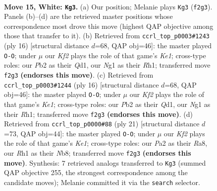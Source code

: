 \documentclass[11pt]{article}
\begin{document}
\begin{figure}[p]
\label{fig:thought-m26}
\end{figure}

\clearpage

\begin{figure}[p]\centering
\begin{subfigure}{0.46\textwidth}\centering
\resizebox{\linewidth}{!}{%
\newchessgame
\chessboard[
  setfen={2b1qrk1/r1pnnppp/1p2p3/p2pP3/3P1P2/2N5/PPP2KPP/R2Q1BNR w - - 0 15},
  showmover=false,
  pgfstyle=straightmove, color=movearrow, markmove={f2-g3}
]}
\caption{}
\end{subfigure}\hfill
\begin{subfigure}{0.46\textwidth}\centering
\resizebox{\linewidth}{!}{%
\newchessgame
\chessboard[
  setfen={rnbq1rk1/pp3pbp/2pp1np1/8/2PNP3/2N3P1/PP3PBP/R1BQK2R w KQ - 1 9},
  showmover=false,
  pgfstyle=straightmove, color=movearrow, markmove={e1-g1}
]}
\caption{}
\end{subfigure}
\\[4pt]
\begin{subfigure}{0.46\textwidth}\centering
\resizebox{\linewidth}{!}{%
\newchessgame
\chessboard[
  setfen={rnbq1rk1/pp3pbp/2pp1np1/8/2PNP3/2N3P1/PP3PBP/R1BQK2R w KQ - 1 9},
  showmover=false,
  pgfstyle=straightmove, color=movearrow, markmove={e1-g1}
]}
\caption{}
\end{subfigure}\hfill
\begin{subfigure}{0.46\textwidth}\centering
\resizebox{\linewidth}{!}{%
\newchessgame
\chessboard[
  setfen={rn2k2r/1p1qbpp1/p6p/2ppP3/P3nN2/5N2/1PPP2PP/R1BQ1RK1 b kq - 1 11},
  showmover=false,
  pgfstyle=straightmove, color=movearrow, markmove={e8-g8}
]}
\caption{}
\end{subfigure}
\caption{\textbf{Move 15, White: \texttt{Kg3}.} (a) Our position; Melanie plays \texttt{Kg3} (\texttt{f2g3}). Panels (b)--(d) are the retrieved master positions whose correspondence most drove this move (highest QAP objective among those that transfer to it). (b) Retrieved from \texttt{ccrl\_top\_p0003\#1243} (ply 16) [structural distance $d$=68, QAP obj=46]: the master played \texttt{O-O}; under $\mu$ our \emph{Kf2} plays the role of that game's \emph{Ke1}; cross-type roles: our \emph{P}b2 as their \emph{Q}d1, our \emph{N}g1 as their \emph{R}h1; transferred move \texttt{f2g3} \textbf{(endorses this move)}. (c) Retrieved from \texttt{ccrl\_top\_p0003\#1244} (ply 16) [structural distance $d$=68, QAP obj=46]: the master played \texttt{O-O}; under $\mu$ our \emph{Kf2} plays the role of that game's \emph{Ke1}; cross-type roles: our \emph{P}b2 as their \emph{Q}d1, our \emph{N}g1 as their \emph{R}h1; transferred move \texttt{f2g3} \textbf{(endorses this move)}. (d) Retrieved from \texttt{ccrl\_top\_p0000\#88} (ply 21) [structural distance $d$=73, QAP obj=44]: the master played \texttt{O-O}; under $\mu$ our \emph{Kf2} plays the role of that game's \emph{Ke1}; cross-type roles: our \emph{P}a2 as their \emph{R}a8, our \emph{R}h1 as their \emph{N}b8; transferred move \texttt{f2g3} \textbf{(endorses this move)}. Synthesis: 7 retrieved analogs transferred to \texttt{Kg3} (summed QAP objective 255, the strongest correspondence among the candidate moves); Melanie committed it via the \texttt{search} selector.}

\end{figure}
\end{document}

